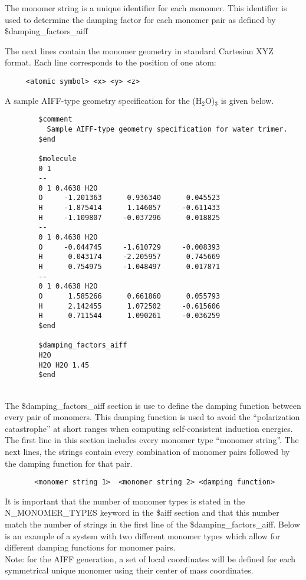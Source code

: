 \documentclass[11pt,letterpaper]{article}
\begin{document}
\begin{spacing}{1.0}
The monomer string is a unique identifier for each monomer. This identifier 
is used to determine the damping factor for each monomer pair as defined by
\$damping\_factors\_aiff  

The next lines contain the monomer geometry in standard Cartesian XYZ
format.  Each line corresponds to the position of one atom:
\begin{verbatim}
     <atomic symbol> <x> <y> <z>
\end{verbatim}
A sample AIFF-type geometry specification for the (H$_2$O)$_3$ is given below.\\
\vspace{5mm}
\hrulefill
\begin{verbatim}
        $comment
          Sample AIFF-type geometry specification for water trimer.
        $end

        $molecule
        0 1
        --
        0 1 0.4638 H2O
        O     -1.201363      0.936340      0.045523
        H     -1.875414      1.146057     -0.611433
        H     -1.109807     -0.037296      0.018825
        --
        0 1 0.4638 H2O
        O     -0.044745     -1.610729     -0.008393 
        H      0.043174     -2.205957      0.745669 
        H      0.754975     -1.048497      0.017871 
        --
        0 1 0.4638 H2O
        O      1.585266      0.661860      0.055793 
        H      2.142455      1.072502     -0.615606 
        H      0.711544      1.090261     -0.036259 
        $end
     
        $damping_factors_aiff
        H2O
        H2O H2O 1.45
        $end
\end{verbatim}
\hrulefill
\vspace{5mm}
\\
The \$damping\_factors\_aiff section is use to define the damping 
function between every pair of monomers. This damping function is used to 
avoid the “polarization catastrophe” 
at short ranges when computing self-consistent
induction energies. The first line in this section includes every 
monomer type ``monomer string''. The next lines, the
strings contain every combination of monomer pairs followed by the damping
function for that pair. 

\vspace{5mm}
\begin{verbatim}
       <monomer string 1>  <monomer string 2> <damping function>
\end{verbatim}

It is important that  the number of monomer types 
is stated in the N\_MONOMER\_TYPES keyword 
in the \$aiff section and that this number match the number
of strings in the first line of the
\$damping\_factors\_aiff. Below is an example
of a system with two different monomer types which allow for different 
damping functions for monomer pairs.\\
Note: for the AIFF generation, a set of local coordinates will be
defined for each symmetrical unique monomer using their center of mass coordinates.




\end{spacing}
\end{document}
